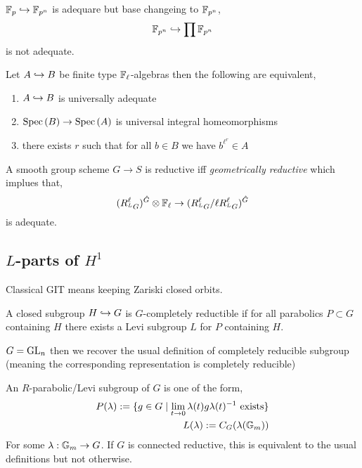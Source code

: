 \documentclass[12pt]{article}
\begin{document}
\begin{example}
$\mathbb{F}_p \hookrightarrow \mathbb{F}_{p^n}$ is adequare but base changeing to $\mathbb{F}_{p^n}$,
\[ \mathbb{F}_{p^n} \hookrightarrow \prod \mathbb{F}_{p^n} \]
is not adequate. 
\end{example}

\begin{prop}
Let $A \hookrightarrow B$ be finite type $\mathbb{F}_\ell$-algebras then the following are equivalent,
\begin{enumerate}
\item $A \hookrightarrow B$ is universally adequate
\item $\mathrm{Spec}\left( B \right) \to \mathrm{Spec}\left( A \right)$ is universal integral homeomorphisms
\item there exists $r$ such that for all $b \in B$ we have $b^{\ell^r} \in A$
\end{enumerate}
\end{prop}

\begin{theorem}
A smooth group scheme $G \to S$ is reductive iff \textit{geometrically reductive} which implues that,
\[ (R_{{}^L G}^\ell)^{\hat{G}} \otimes \mathbb{F}_\ell \to (R_{{}^L G}^\ell / \ell R_{{}^L G}^\ell)^{\hat{G}} \]
is adequate. 
\end{theorem}

\subsection{$L$-parts of $H^1$}

Classical GIT means keeping Zariski closed orbits. 

\begin{defn}
A closed subgroup $H \hookrightarrow G$ is $G$-completely reductible if for all parabolics $P \subset G$ containing $H$ there exists a Levi subgroup $L$ for $P$ containing $H$. 
\end{defn}

\begin{example}
$G = \mathrm{GL}_n$ then we recover the usual definition of completely reducible subgroup (meaning the corresponding representation is completely reducible)
\end{example}

\begin{defn}
An $R$-parabolic/Levi subgroup of $G$ is one of the form,
\begin{align*}
P(\lambda) := \{ g \in G \mid \lim_{t \to 0} \lambda(t) g \lambda(t)^{-1} \text{ exists} \}
\\
L(\lambda) := C_G(\lambda(\mathbb{G}_m))
\end{align*}
For some $\lambda : \mathbb{G}_m \to G$.
If $G$ is connected reductive, this is equivalent to the usual definitions but not otherwise.
\end{defn}
\end{document}
